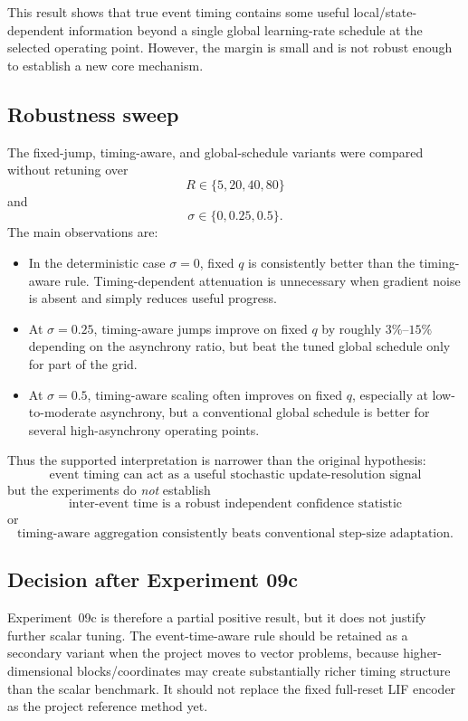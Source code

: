 This result shows that true event timing contains some useful local/state-dependent information beyond a single global learning-rate schedule at the selected operating point. However, the margin is small and is not robust enough to establish a new core mechanism.

\subsection{Robustness sweep}
The fixed-jump, timing-aware, and global-schedule variants were compared without retuning over
\begin{equation}
  R\in\{5,20,40,80\}
\end{equation}
and
\begin{equation}
  \sigma\in\{0,0.25,0.5\}.
\end{equation}
The main observations are:
\begin{itemize}
  \item In the deterministic case \(\sigma=0\), fixed \(q\) is consistently better than the timing-aware rule. Timing-dependent attenuation is unnecessary when gradient noise is absent and simply reduces useful progress.
  \item At \(\sigma=0.25\), timing-aware jumps improve on fixed \(q\) by roughly \(3\%\)--\(15\%\) depending on the asynchrony ratio, but beat the tuned global schedule only for part of the grid.
  \item At \(\sigma=0.5\), timing-aware scaling often improves on fixed \(q\), especially at low-to-moderate asynchrony, but a conventional global schedule is better for several high-asynchrony operating points.
\end{itemize}

Thus the supported interpretation is narrower than the original hypothesis:
\begin{equation}
  \boxed{\text{event timing can act as a useful stochastic update-resolution signal}}
\end{equation}
but the experiments do \emph{not} establish
\begin{equation}
  \boxed{\text{inter-event time is a robust independent confidence statistic}}
\end{equation}
or
\begin{equation}
  \boxed{\text{timing-aware aggregation consistently beats conventional step-size adaptation}.}
\end{equation}

\subsection{Decision after Experiment 09c}
Experiment~09c is therefore a partial positive result, but it does not justify further scalar tuning. The event-time-aware rule should be retained as a secondary variant when the project moves to vector problems, because higher-dimensional blocks/coordinates may create substantially richer timing structure than the scalar benchmark. It should not replace the fixed full-reset LIF encoder as the project reference method yet.

